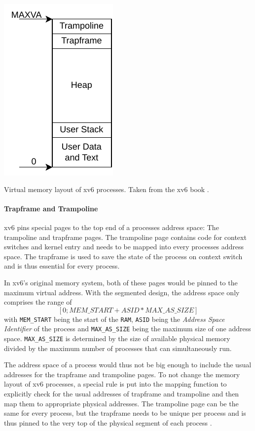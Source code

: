 \begin{marginfigure}
    \centering
    \includegraphics[scale=.8]{figures/prog_vm.pdf}
    \caption[xv6 memory layout]{Virtual memory layout of xv6 processes. Taken from the xv6 book \cite{cox2011xv6}.}
    \label{impl:proclayout}
\end{marginfigure}


\paragraph{Trapframe and Trampoline} xv6 pins special pages to the top end of a processes address space: The trampoline and trapframe pages.
The trampoline page contains code for context switches and kernel entry and needs to be mapped
into every processes address space.
The trapframe is used to save the state of the process on context switch and is thus essential for every process.

In xv6's original memory system, both of these pages would be pinned to the maximum virtual address.
With the segmented design, the address space only comprises the range of \[
    [0 ; MEM\_START+ASID*MAX\_AS\_SIZE]
\]
with \texttt{MEM\_START} being the start of the \texttt{RAM}, \texttt{ASID} being the \emph{Address Space Identifier} of the process and \texttt{MAX\_AS\_SIZE} being the maximum size of one address space.
\texttt{MAX\_AS\_SIZE} is determined by the size of available physical memory divided by the maximum
number of processes that can simultaneously run.

The address space of a process would thus not be big enough to include the usual addresses for the
trapframe and trampoline pages.
To not change the memory layout of xv6 processes, a special rule is put into the mapping function
to explicitly check for the usual addresses of trapframe and trampoline and then map them to appropriate physical addresses.
The trampoline page can be the same for every process, but the trapframe needs to be unique per
process and is thus pinned to the very top of the physical segment of each process \cite{cox2011xv6}.


